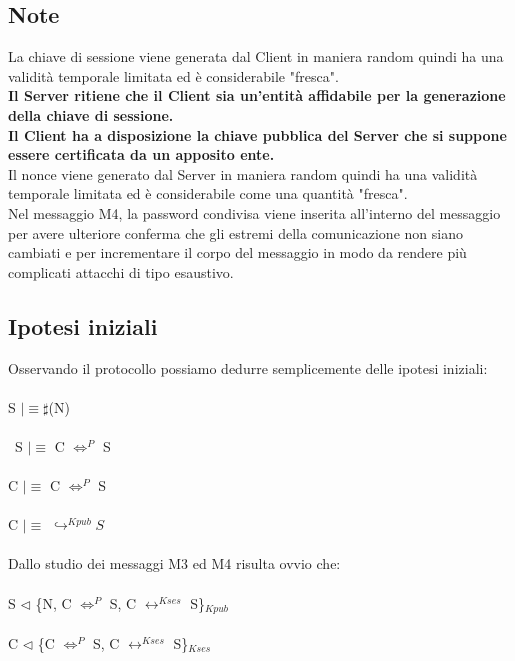 \documentclass[12pt, a4paper]{article}
\begin{document}
\subsection{Note}
La chiave di sessione viene generata dal Client in maniera random quindi ha una validità temporale limitata ed è considerabile "fresca".\\
\textbf{Il Server ritiene che il Client sia un'entità affidabile per la generazione della chiave di sessione.}\\
\textbf{Il Client ha a disposizione la chiave pubblica del Server che si suppone essere certificata da un apposito ente.}\\
Il nonce viene generato dal Server in maniera random quindi ha una validità temporale limitata ed è considerabile come una quantità "fresca".\\
Nel messaggio M4, la password condivisa viene inserita all'interno del messaggio per avere ulteriore conferma che gli estremi della comunicazione non siano cambiati e per incrementare il corpo del messaggio in modo da rendere più complicati attacchi di tipo esaustivo.
\subsection{Ipotesi iniziali}
Osservando il protocollo possiamo dedurre semplicemente delle ipotesi iniziali:\\\\
S $\mid\equiv\sharp$(N)\\\\\
S $\mid\equiv$ C $\Longleftrightarrow^{P}$ S\\\\
C $\mid\equiv$ C $\Longleftrightarrow^{P}$ S\\\\ 
C $\mid\equiv$ $\hookrightarrow^{Kpub}S$\\\\
Dallo studio dei messaggi M3 ed M4 risulta ovvio che:\\\\
S $\lhd$ \{N, C $\Longleftrightarrow^{P}$ S, C $\longleftrightarrow^{Kses}$ S\}$_{Kpub}$\\\\
C $\lhd$ \{C $\Longleftrightarrow^{P}$ S, C $\longleftrightarrow^{Kses}$ S\}$_{Kses}$
\end{document}
